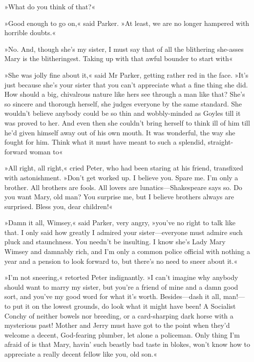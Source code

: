 »What do you think of that?«

»Good enough to go on,« said Parker. »At least, we are no longer hampered with horrible doubts.«

»No. And, though she's my sister, I must say that of all the blithering she-asses Mary is the blitheringest. Taking up with that awful bounder to start with\longdash«

»She was jolly fine about it,« said Mr Parker, getting rather red in the face. »It's just because she's your sister that you can't appreciate what a fine thing she did. How should a big, chivalrous nature like hers see through a man like that? She's so sincere and thorough herself, she judges everyone by the same standard. She wouldn't believe anybody could be so thin and wobbly-minded as Goyles till it was proved to her. And even then she couldn't bring herself to think ill of him till he'd given himself away out of his own mouth. It was wonderful, the way she fought for him. Think what it must have meant to such a splendid, straight-forward woman to\longdash«

»All right, all right,« cried Peter, who had been staring at his friend, transfixed with astonishment. »Don't get worked up. I believe you. Spare me. I'm only a brother. All brothers are fools. All lovers are lunatics\allowbreak---\allowbreak Shakespeare says so. Do you want Mary, old man? You surprise me, but I believe brothers always are surprised. Bless you, dear children!«

»Damn it all, Wimsey,« said Parker, very angry, »you've no right to talk like that. I only said how greatly I admired your sister\allowbreak---\allowbreak everyone must admire such pluck and staunchness. You needn't be insulting. I know she's Lady Mary Wimsey and damnably rich, and I'm only a common police official with nothing a year and a pension to look forward to, but there's no need to sneer about it.«

»I'm not sneering,« retorted Peter indignantly. »I can't imagine why anybody should want to marry my sister, but you're a friend of mine and a damn good sort, and you've my good word for what it's worth. Besides\allowbreak---\allowbreak dash it all, man!---to put it on the lowest grounds, do look what it might have been! A Socialist Conchy of neither bowels nor breeding, or a card-sharping dark horse with a mysterious past! Mother and Jerry must have got to the point when they'd welcome a decent, God-fearing plumber, let alone a policeman. Only thing I'm afraid of is that Mary, havin' such beastly bad taste in blokes, won't know how to appreciate a really decent fellow like you, old son.«

